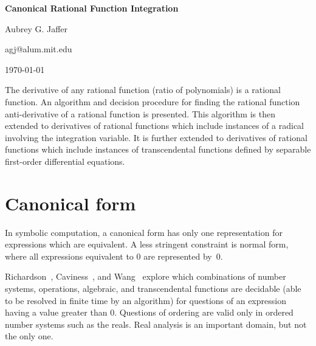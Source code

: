 


\def\diff{\mathop{\rm d}\nolimits}
\def\W{\mathop{\rm W}\nolimits}
\def\at{{@}}

\def\coeff{{\rm coeff}\,}
\def\atanh{\mathop{\rm atanh}\nolimits}
\def\erf{\mathop{\rm erf}\nolimits}
\def\fre{\mathop{\rm fre}\nolimits}

\centerline{\bf{Canonical Rational Function Integration}}
\centerline{Aubrey G. Jaffer}
\centerline{agj@alum.mit.edu}
\centerline{\today}


{\narrower

  The derivative of any rational function (ratio of polynomials) is a
  rational function.  An algorithm and decision procedure for finding
  the rational function anti-derivative of a rational function is
  presented.  This algorithm is then extended to derivatives of
  rational functions which include instances of a radical involving
  the integration variable.  It is further extended to derivatives of
  rational functions which include instances of transcendental
  functions defined by separable first-order differential equations.

  \par}



\readtocfile

\section{Canonical form}

In symbolic computation, a canonical form has only one representation
for expressions which are equivalent.  A less stringent constraint is
normal form, where all expressions equivalent to 0 are represented
by~0.

Richardson~\cite{10.2307/2271358},
Caviness~\cite{Caviness:1970:CFS:321574.321591}, and
Wang~\cite{10.1145/321850.321856} explore which combinations of number
systems, operations, algebraic, and transcendental functions are
decidable (able to be resolved in finite time by an algorithm) for
questions of an expression having a value greater than 0.  Questions
of ordering are valid only in ordered number systems such as the
reals.  Real analysis is an important domain, but not the only one.

